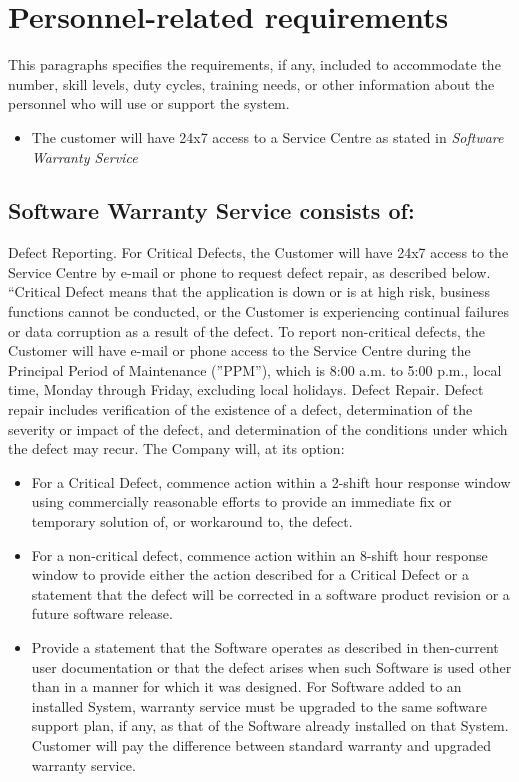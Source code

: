 \section{Personnel-related requirements}
This paragraphs specifies the requirements, if any, included to accommodate the number, skill levels, duty cycles, training needs, or other information about the personnel who will use or support the system.

\begin{itemize}
	\item The customer will have 24x7 access to a Service Centre as stated in \emph{Software Warranty Service}
\end{itemize}


\subsection{Software Warranty Service consists of:}
Defect Reporting. For Critical Defects, the Customer will have 24x7 access to the Service Centre by e-mail or phone to request defect repair, as described below. “Critical Defect means that the
application is down or is at high risk, business functions cannot be conducted, or the Customer is experiencing continual failures or data corruption as a result of the defect. To report non-critical
defects, the Customer will have e-mail or phone access to the Service Centre during the Principal Period of Maintenance (”PPM”), which is 8:00 a.m. to 5:00 p.m., local time, Monday through Friday,
excluding local holidays. Defect Repair. Defect repair includes verification of the existence of a defect, determination of the
severity or impact of the defect, and determination of the conditions under which the defect may recur. 
The Company will, at its option: 
\begin{itemize}
\item For a Critical Defect, commence action within a 2-shift hour response window using commercially reasonable efforts to provide an immediate fix or temporary solution of, or workaround
to, the defect.
\item For a non-critical defect, commence action within an 8-shift hour response window to provide either the action described for a Critical Defect or a statement that the defect will be corrected
in a software product revision or a future software release.
\item Provide a statement that the Software operates as described in then-current user documentation or that the defect arises when such Software is used other than in a manner for which it
was designed. For Software added to an installed System, warranty service must be upgraded to the same software support plan, if any, as that of the Software already installed on that
System. Customer will pay the difference between standard warranty and upgraded warranty
service.
\end{itemize}


